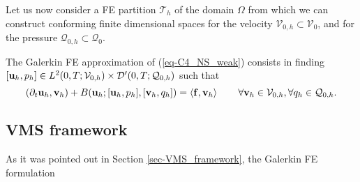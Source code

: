 Let us now consider a FE partition $\mathcal{T}_h$ of the domain $\Omega$ from which we can construct conforming finite dimensional spaces for the velocity $\mathcal{V}_{0,h} \subset \mathcal{V}_0$, and for the pressure $\mathcal{Q}_{0,h}\subset \mathcal{Q}_0$. 

The Galerkin FE approximation of (\ref{eq-C4_NS_weak}) consists in finding $[{\bf u}_h,p_h]\in {L}^2(0,T;\mathcal{V}_{0,h})\times {\cal D}'(0,T;\mathcal{Q}_{0,h})$ such that
\begin{equation}
\label{eq-C4_NS_galerkin}
(\partial_t{\bf u}_h,{\bf v}_h) + B({\bf u}_h;[{\bf u}_h,p_h],[{\bf v}_h,q_h]) =\left<{\bf f},{\bf v}_h\right>
\quad\quad\forall{\bf v}_h\in\mathcal{V}_{0,h},\forall q_h\in\mathcal{Q}_{0,h}.
\end{equation}

\subsection{VMS framework}
\label{subsec-C4_C4_VMS_framework}
As it was pointed out in Section \ref{sec-VMS_framework}, the Galerkin FE formulation  
